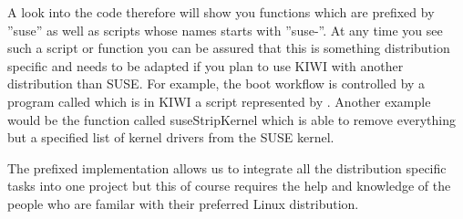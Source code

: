 A look into the code therefore will show you functions which are
prefixed by ''suse'' as well as scripts whose names starts with
''suse-''. At any time you see such a script or function
you can be assured that this is something distribution specific
and needs to be adapted if you plan to use KIWI with another
distribution than SUSE. For example, the boot workflow is controlled
by a program called  which is in KIWI a script represented
by . Another example would be the function called
suseStripKernel which is able to remove everything but a specified
list of kernel drivers from the SUSE kernel.

The prefixed implementation allows us to integrate all the
distribution specific tasks into one project but this of course
requires the help and knowledge of the people who are familar
with their preferred Linux distribution. 

